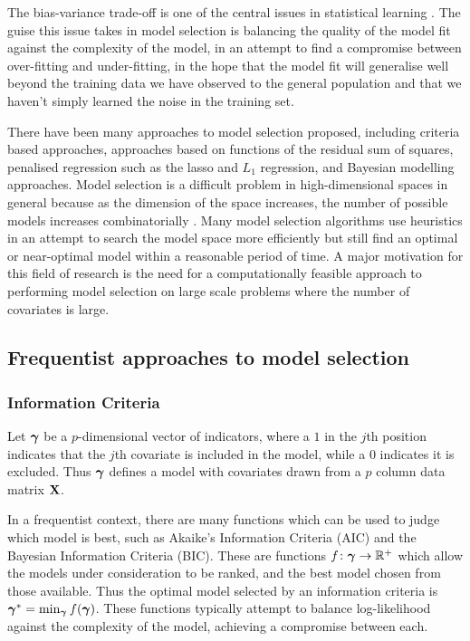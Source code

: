 The bias-variance trade-off is one of the central issues in statistical learning
\citep{Murphy:2012:MLP:2380985, Bishop:2006:PRM:1162264,
hastie01statisticallearning}. The guise this issue takes in model selection is
balancing the quality of the model fit against the complexity of the model, in
an attempt to find a compromise between over-fitting and under-fitting, in the
hope that the model fit will generalise well beyond the training data we have
observed to the general population and that we haven't simply learned the noise
in the training set.

There have been many approaches to model selection proposed, including criteria
based approaches, approaches based on functions of the
residual sum of squares, penalised regression such as the lasso and $L_1$
regression, and Bayesian modelling approaches. Model selection is a difficult
problem in high-dimensional spaces in general because as the dimension of the
space increases, the number of possible models increases combinatorially
\citep{Schelldorfer2010}. Many model selection algorithms use heuristics in an
attempt to search the model space more efficiently but still find an optimal or
near-optimal model within a reasonable period of time. A major motivation for
this field of research is the need for a computationally feasible approach to
performing model selection on large scale problems where the number of
covariates is large.


\subsection{Frequentist approaches to model selection}
\subsubsection{Information Criteria}

Let ${\boldsymbol \gamma}$ be a $p$-dimensional vector of indicators, where a $1$ in the
$j$th position indicates that the $j$th covariate is included in the model,
while a $0$ indicates it is excluded. Thus ${\boldsymbol \gamma}$ defines a model with
covariates drawn from a $p$ column data matrix ${\bf X}$.

In a frequentist context, there are many functions which can be used to judge
which model is best, such as Akaike's Information Criteria (AIC) and the Bayesian 
Information Criteria (BIC). These are functions $f\colon {\boldsymbol\gamma} \to {\mathbb{R}}^+$ which allow the
models under consideration to be ranked, and the best model chosen from those
available. Thus the optimal model selected by an information criteria is
${\boldsymbol \gamma}^* = \min_{\boldsymbol \gamma} f({\boldsymbol \gamma})$. These functions typically attempt to
balance log-likelihood against the complexity of the model, achieving a
compromise between each.


